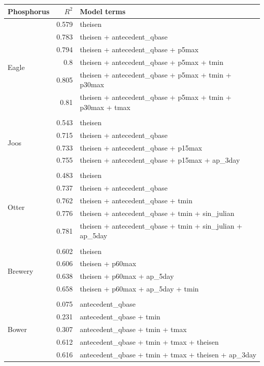 \documentclass[12pt]{article}
\begin{document}
\begin{table}[h]
\begin{center}
\begin{tabular}{lrl}
    \textbf{Phosphorus} & $R^2$ & Model terms \\
    \hline
\multirow{7}{*}{Eagle} & 0.579 & theisen\\ 
 & 0.783 & theisen + antecedent\_qbase\\ 
 & 0.794 & theisen + antecedent\_qbase + p5max\\ 
 & 0.8 & theisen + antecedent\_qbase + p5max + tmin\\ 
 & 0.805 & theisen + antecedent\_qbase + p5max + tmin + p30max\\ 
 & 0.81 & theisen + antecedent\_qbase + p5max + tmin + p30max + tmax\\ 
\vspace{2mm}\\ \multirow{5}{*}{Joos} & 0.543 & theisen\\ 
 & 0.715 & theisen + antecedent\_qbase\\ 
 & 0.733 & theisen + antecedent\_qbase + p15max\\ 
 & 0.755 & theisen + antecedent\_qbase + p15max + ap\_3day\\ 
\vspace{2mm}\\ \multirow{6}{*}{Otter} & 0.483 & theisen\\ 
 & 0.737 & theisen + antecedent\_qbase\\ 
 & 0.762 & theisen + antecedent\_qbase + tmin\\ 
 & 0.776 & theisen + antecedent\_qbase + tmin + sin\_julian\\ 
 & 0.781 & theisen + antecedent\_qbase + tmin + sin\_julian + ap\_5day\\ 
\vspace{2mm}\\ \multirow{5}{*}{Brewery} & 0.602 & theisen\\ 
 & 0.606 & theisen + p60max\\ 
 & 0.638 & theisen + p60max + ap\_5day\\ 
 & 0.658 & theisen + p60max + ap\_5day + tmin\\ 
\vspace{2mm}\\ \multirow{9}{*}{Bower} & 0.075 & antecedent\_qbase\\ 
 & 0.231 & antecedent\_qbase + tmin\\ 
 & 0.307 & antecedent\_qbase + tmin + tmax\\ 
 & 0.612 & antecedent\_qbase + tmin + tmax + theisen\\ 
 & 0.616 & antecedent\_qbase + tmin + tmax + theisen + ap\_3day\\ 

\end{tabular}
\end{center}
\end{table}
\end{document}
